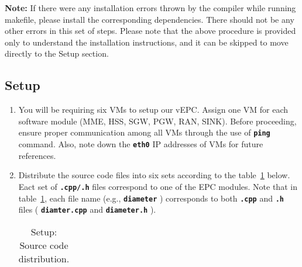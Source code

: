 \documentclass[hidelinks]{report}
\newcommand{\cf}[1] {
	\textbf{\texttt{#1}}
}
\begin{document}
\textbf{Note:} If there were any installation errors thrown by the compiler while running makefile, please install the corresponding dependencies. There should not be any other errors in this set of steps. Please note that the above procedure is provided only to understand the installation instructions, and it can be skipped to move directly to the Setup section.

\subsection*{Setup}

\begin{enumerate}

\item You will be requiring six VMs to setup our vEPC. Assign one VM for each software module (MME, HSS, SGW, PGW, RAN, SINK). Before proceeding, ensure proper communication among all VMs through the use of \cf{ping} command. Also, note down the \cf{eth0} IP addresses of VMs for future references.

\item Distribute the source code files into six sets according to the table~\ref{distribution} below. Eact set of \cf{.cpp/.h} files correspond to one of the EPC modules. Note that in table~\ref{distribution}, each file name (e.g., \cf{diameter}) corresponds to both \cf{.cpp} and \cf{.h} files (\cf{diamter.cpp} and \cf{diameter.h}).

\begin{table}[H]

\caption{Setup: Source code distribution.}
\centering
\label{distribution}
\def\arraystretch{1.5}

\begin{tabular}{|c|c|c|c|c|c|c|}


\end{tabular}
\end{table}
\end{enumerate}
\end{document}
